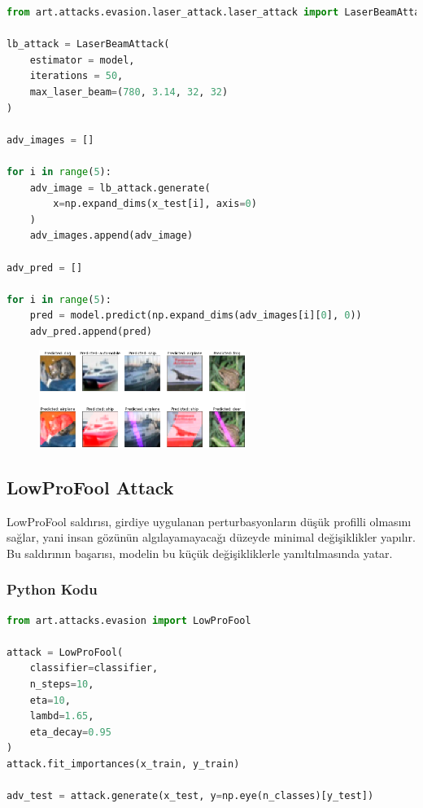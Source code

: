 \begin{lstlisting}[language=Python]
from art.attacks.evasion.laser_attack.laser_attack import LaserBeamAttack

lb_attack = LaserBeamAttack(
    estimator = model,
    iterations = 50,
    max_laser_beam=(780, 3.14, 32, 32)
)

adv_images = []

for i in range(5):
    adv_image = lb_attack.generate(
        x=np.expand_dims(x_test[i], axis=0)
    )
    adv_images.append(adv_image)

adv_pred = []

for i in range(5):
    pred = model.predict(np.expand_dims(adv_images[i][0], 0))
    adv_pred.append(pred)
\end{lstlisting}

\begin{figure}[h]
    \centering
    \includegraphics[width=0.6\textwidth]{images/evasion_laser_beam.png}
    \caption{}
\end{figure}

\newpage

\subsection{LowProFool Attack}

LowProFool saldırısı, girdiye uygulanan perturbasyonların düşük profilli olmasını sağlar, yani insan gözünün algılayamayacağı düzeyde minimal değişiklikler yapılır. Bu saldırının başarısı, modelin bu küçük değişikliklerle yanıltılmasında yatar.

\subsubsection{Python Kodu}

\begin{lstlisting}[language=Python]
from art.attacks.evasion import LowProFool

attack = LowProFool(
    classifier=classifier,
    n_steps=10,
    eta=10,
    lambd=1.65,
    eta_decay=0.95
)
attack.fit_importances(x_train, y_train)

adv_test = attack.generate(x_test, y=np.eye(n_classes)[y_test])
\end{lstlisting}

